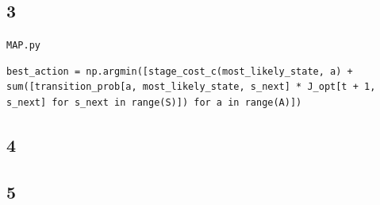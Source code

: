 \clearpage
\subsection{3}
\texttt{MAP.py}
\begin{lstlisting}[numbers=none]
best_action = np.argmin([stage_cost_c(most_likely_state, a) + sum([transition_prob[a, most_likely_state, s_next] * J_opt[t + 1, s_next] for s_next in range(S)]) for a in range(A)])
\end{lstlisting}

\subsection{4}


\subsection{5}


